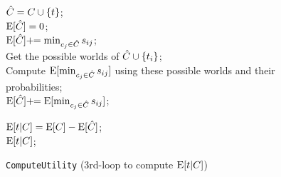 
 \begin{figure}[!t]
 \vspace{-1em}
	\begin{algorithm}[H]
		\normalem
	\caption{\texttt{ComputeUtility} (3rd-loop to compute $\mathrm{E}[t|C]$) \label{alg:one}}
		{\small
		    $\hat{C} = C \cup \{t\}$;\\
		    $\mathrm{E}[\hat{C}] = 0$; \\
			{    
                {
                   $\mathrm{E}[\hat{C}] +\!\!= \min_{c_j\in \hat{C}}s_{ij}$;\\
                }
                \Else 
                {
                	Get the possible worlds of $\hat{C} \cup \{t_i\}$;\\
                	Compute $\mathrm{E}[\min_{c_j\in \hat{C}}s_{ij}]$ using these possible worlds and their probabilities;\\
                	$\mathrm{E}[\hat{C}] +\!\!= \mathrm{E}[\min_{c_j\in \hat{C}}s_{ij}]$;\\
                } 
			}	
		
	 	$\mathrm{E}[t|C] = \mathrm{E}[C] - \mathrm{E}[\hat{C}]$;\\
		\Return $\mathrm{E}[t|C]$;\\
		}
	\end{algorithm}
\vspace{-2em}
\end{figure}